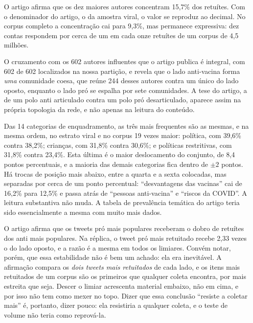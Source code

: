 \begin{description}[leftmargin=1.5em,style=nextline]
  \item[A concentração é estrutural, não artefato do corte.] O artigo afirma que os
  dez maiores autores concentram 15,7\% dos retuítes. Com o denominador do artigo,
  o da amostra viral, o valor se reproduz ao decimal. No corpus completo a
  concentração cai para 9,3\%, mas permanece expressiva: dez contas respondem por
  cerca de um em cada onze retuítes de um corpus de 4,5 milhões.
  \item[A topologia confirma a assimetria de articulação entre os polos.] O
  cruzamento com os 602 autores influentes que o artigo publica é integral, com
  602 de 602 localizados na nossa partição, e revela que o lado anti-vacina forma
  \emph{uma} comunidade coesa, que reúne 244 desses autores contra um único do
  lado oposto, enquanto o lado pró se espalha por sete comunidades. A tese do
  artigo, a de um polo anti articulado contra um polo pró desarticulado, aparece
  assim na própria topologia da rede, e não apenas na leitura do conteúdo.
  \item[A composição temática convergiu.] Das 14 categorias de enquadramento, as
  três mais frequentes são as mesmas, e na mesma ordem, no estrato viral e no
  corpus 19 vezes maior: política, com 39,6\% contra 38,2\%; crianças, com 31,8\%
  contra 30,6\%; e políticas restritivas, com 31,8\% contra 23,4\%. Esta última é o
  maior deslocamento do conjunto, de 8,4 pontos percentuais, e a maioria das demais
  categorias fica dentro de $\pm2$ pontos. Há trocas de posição mais abaixo, entre
  a quarta e a sexta colocadas, mas separadas por cerca de um ponto percentual:
  ``desvantagens das vacinas'' cai de 16,2\% para 12,5\% e passa atrás de ``pessoas
  anti-vacina'' e ``riscos da COVID''. A leitura substantiva não muda. A tabela de
  prevalência temática do artigo teria sido essencialmente a mesma com muito mais
  dados.
  \item[A vantagem dos tweets pró em retuítes se mantém.] O artigo afirma que os
  tweets pró mais populares receberam o dobro de retuítes dos anti mais populares.
  Na réplica, o tweet pró mais retuitado recebe 2,33 vezes o do lado oposto, e a
  razão é a mesma em todos os limiares. Convém notar, porém, que essa estabilidade
  não é bem um achado: ela era inevitável. A afirmação compara os \emph{dois tweets
  mais retuitados} de cada lado, e os itens mais retuitados de um corpus são os
  primeiros que qualquer coleta encontra, por mais estreita que seja. Descer o
  limiar acrescenta material embaixo, não em cima, e por isso não tem como mexer no
  topo. Dizer que essa conclusão ``resiste a coletar mais'' é, portanto, dizer
  pouco: ela resistiria a qualquer coleta, e o teste de volume não teria como
  reprová-la.
\end{description}

